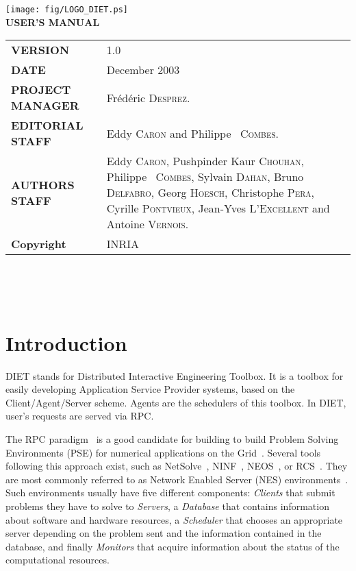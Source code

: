 \documentclass[12pt,a4paper]{book}
\newcommand{\nsl}{NetSolve}
\begin{document}

\thispagestyle{empty}
\vspace*{3cm}
\vspace*{3cm}

\begin{center}
\texttt{[image: fig/LOGO\_DIET.ps]}\\[2ex]
\textbf{\Huge USER'S MANUAL\\[2ex]}
\end{center}

\vfill


\noindent
\small{
\begin{tabular}{ll}
  \textbf{VERSION}  & 1.0\\
  \textbf{DATE}     & December 2003\\
  \textbf{PROJECT MANAGER}  & Fr\'ed\'eric \textsc{Desprez}.\\
  \textbf{EDITORIAL STAFF}  & Eddy \textsc{Caron} and Philippe ~\textsc{Combes}.\\
  \textbf{AUTHORS STAFF}    & 
\begin{minipage}[t]{12cm}
  Eddy \textsc{Caron}, Pushpinder Kaur \textsc{Chouhan}, Philippe ~\textsc{Combes},
  Sylvain \textsc{Dahan}, Bruno \textsc{Delfabro}, Georg \textsc{Hoesch}, Christophe \textsc{Pera}, Cyrille \textsc{Pontvieux}, Jean-Yves \textsc{L'Excellent} and Antoine \textsc{Vernois}.
\end{minipage} \\
  \textbf{Copyright}& INRIA
\end{tabular}\\
}

\newpage
\thispagestyle{empty}
\ 



\newpage
\tableofcontents


%
%
\newpage
{}
\chapter*{Introduction}


DIET stands for Distributed Interactive Engineering Toolbox. It is a
toolbox for easily developing Application Service Provider systems,
based on the Client/Agent/Server scheme. Agents are the schedulers of
this toolbox. In DIET, user's requests are served via RPC.

The RPC paradigm~\cite{CM00,MNS+00} is a good candidate for building
to build Problem Solving Environments (PSE) for numerical applications
on the Grid~\cite{HR00}. Several tools following this approach exist,
such as \nsl~\cite{nug}, NINF~\cite{NSS99}, NEOS~\cite{FMM00}, or
RCS~\cite{AGM97}. They are most commonly referred to as Network
Enabled Server (NES) environments~\cite{MNS+00}. Such environments
usually have five different components: \emph{Clients} that submit
problems they have to solve to \emph{Servers}, a \emph{Database} that
contains information about software and hardware resources, a
\emph{Scheduler} that chooses an appropriate server
depending on the problem sent and the information contained in the
database, and finally \emph{Monitors} that acquire information about
the status of the computational resources.
\end{document}
